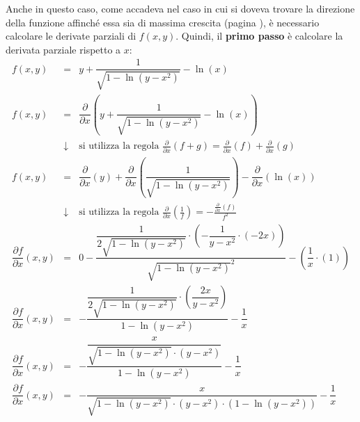 \documentclass[a4paper]{article}
\begin{document}
	\noindent
	Anche in questo caso, come accadeva nel caso in cui si doveva trovare la direzione della funzione affinché essa sia di massima crescita (pagina \pageref{par: direzione della funzione affinché essa sia di massima crescita}), è necessario calcolare le derivate parziali di $f\left(x,y\right)$. Quindi, il \textbf{primo passo} è calcolare la derivata parziale rispetto a $x$:
	\begin{equation*}
		\begin{array}{rcl}
			f\left(x,y\right) &=& y + \dfrac{1}{\sqrt{1 - \ln\left(y - x^{2}\right)}} - \ln\left(x\right) \\ [1.5em]
			f\left(x,y\right) &=& \dfrac{\partial}{\partial x} \left( y + \dfrac{1}{\sqrt{1 - \ln\left(y - x^{2}\right)}} - \ln\left(x\right) \right) \\ [2em]
			&\downarrow& \text{si utilizza la regola } \frac{\partial}{\partial x}\left(f+g\right) = \frac{\partial}{\partial x}\left(f\right) + \frac{\partial}{\partial x}\left(g\right) \\ [1em]
			f\left(x,y\right) &=& \dfrac{\partial}{\partial x} \left(y\right) + \dfrac{\partial}{\partial x} \left(\dfrac{1}{\sqrt{1 - \ln\left(y - x^{2}\right)}}\right) - \dfrac{\partial}{\partial x}\left(\ln\left(x\right)\right) \\ [1.5em]
			&\downarrow& \text{si utilizza la regola } \frac{\partial}{\partial x}\left(\frac{1}{f}\right) = -\frac{\frac{\partial}{\partial x}\left(f\right)}{f^{2}} \\ [1em]
			\dfrac{\partial f}{\partial x}\left(x,y\right) &=& 0 - \dfrac{\dfrac{1}{2\sqrt{1-\ln\left(y-x^{2}\right)}} \cdot \left(-\dfrac{1}{y-x^{2}} \cdot \left(-2x\right)\right)}{\sqrt{1 - \ln\left(y - x^{2}\right)}^{2}} - \left(\dfrac{1}{x} \cdot \left(1\right)\right) \\ [2em]
			\dfrac{\partial f}{\partial x}\left(x,y\right) &=& -\dfrac{\dfrac{1}{2\sqrt{1-\ln\left(y-x^{2}\right)}} \cdot \left(\dfrac{2x}{y-x^{2}}\right)}{1 - \ln\left(y - x^{2}\right)} - \dfrac{1}{x} \\ [2em]
			\dfrac{\partial f}{\partial x}\left(x,y\right) &=& -\dfrac{\dfrac{x}{\sqrt{1-\ln\left(y-x^{2}\right)} \cdot \left(y-x^{2}\right)}}{1-\ln\left(y-x^{2}\right)} - \dfrac{1}{x} \\ [2em]
			\dfrac{\partial f}{\partial x}\left(x,y\right) &=& -\dfrac{x}{\sqrt{1 - \ln\left(y-x^{2}\right)} \cdot \left(y-x^{2}\right) \cdot \left(1 - \ln\left(y-x^{2}\right)\right)} - \dfrac{1}{x}
		\end{array}
	\end{equation*}\newpage
\end{document}
